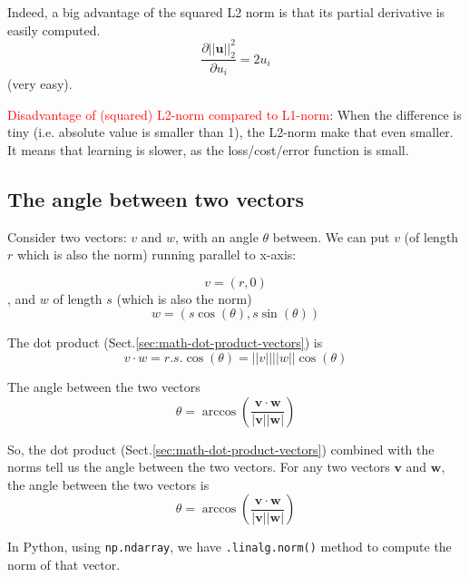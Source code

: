Indeed, a big advantage of the squared L2 norm is that its partial derivative is
easily computed.
\begin{equation}
\frac{\partial ||\mathbf{u}||_2^2}{\partial u_i} = 2u_i
\end{equation}
(very easy).

\textcolor{red}{Disadvantage of (squared) L2-norm compared to L1-norm}: When the
difference is tiny (i.e. absolute value is smaller than 1), the L2-norm make
that even smaller. It means that learning is slower, as the loss/cost/error
function is small.




\subsection{The angle between two vectors}
\label{sec:math-angle-vectors}

Consider two vectors: $v$ and $w$, with an angle $\theta$ between. We can put
$v$ (of length $r$ which is also the norm) running parallel to x-axis:

\begin{equation}
v=(r, 0)
\end{equation}
, and $w$ of length $s$ (which is also the norm)
\begin{equation}
w = (s \cos(\theta), s \sin(\theta))
\end{equation}

The dot product (Sect.\ref{sec:math-dot-product-vectors}) is
\begin{equation}
v \cdot w = r . s . \cos(\theta) = ||v|| ||w|| \cos(\theta)
\end{equation}

The angle between the two vectors
\begin{equation}
\theta = \arccos\left(\frac{\mathbf{v}\cdot\mathbf{w}}{|\mathbf{v}||\mathbf{w}|}\right)
\end{equation}

So, the dot product (Sect.\ref{sec:math-dot-product-vectors}) combined with the
norms tell us the angle between the two vectors.
For any two vectors $\mathbf{v}$ and $\mathbf{w}$, the angle between the two
vectors is
\begin{equation}
\theta = \arccos\left(\frac{\mathbf{v}\cdot\mathbf{w}}{|\mathbf{v}||\mathbf{w}|}\right)
\end{equation}

In Python, using \verb!np.ndarray!, we have \verb!.linalg.norm()! method to compute the norm of that vector.
 
